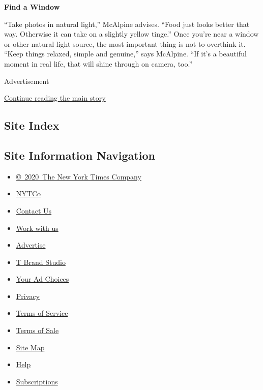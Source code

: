 \textbf{Find a Window}

``Take photos in natural light,'' McAlpine advises. ``Food just looks
better that way. Otherwise it can take on a slightly yellow tinge.''
Once you're near a window or other natural light source, the most
important thing is not to overthink it. ``Keep things relaxed, simple
and genuine,'' says McAlpine. ``If it's a beautiful moment in real life,
that will shine through on camera, too.''

Advertisement

\protect\hyperlink{after-bottom}{Continue reading the main story}

\hypertarget{site-index}{%
\subsection{Site Index}\label{site-index}}

\hypertarget{site-information-navigation}{%
\subsection{Site Information
Navigation}\label{site-information-navigation}}

\begin{itemize}
\tightlist
\item
  \href{https://help.nytimes3xbfgragh.onion/hc/en-us/articles/115014792127-Copyright-notice}{©~2020~The
  New York Times Company}
\end{itemize}

\begin{itemize}
\tightlist
\item
  \href{https://www.nytco.com/}{NYTCo}
\item
  \href{https://help.nytimes3xbfgragh.onion/hc/en-us/articles/115015385887-Contact-Us}{Contact
  Us}
\item
  \href{https://www.nytco.com/careers/}{Work with us}
\item
  \href{https://nytmediakit.com/}{Advertise}
\item
  \href{http://www.tbrandstudio.com/}{T Brand Studio}
\item
  \href{https://www.nytimes3xbfgragh.onion/privacy/cookie-policy\#how-do-i-manage-trackers}{Your
  Ad Choices}
\item
  \href{https://www.nytimes3xbfgragh.onion/privacy}{Privacy}
\item
  \href{https://help.nytimes3xbfgragh.onion/hc/en-us/articles/115014893428-Terms-of-service}{Terms
  of Service}
\item
  \href{https://help.nytimes3xbfgragh.onion/hc/en-us/articles/115014893968-Terms-of-sale}{Terms
  of Sale}
\item
  \href{https://spiderbites.nytimes3xbfgragh.onion}{Site Map}
\item
  \href{https://help.nytimes3xbfgragh.onion/hc/en-us}{Help}
\item
  \href{https://www.nytimes3xbfgragh.onion/subscription?campaignId=37WXW}{Subscriptions}
\end{itemize}
